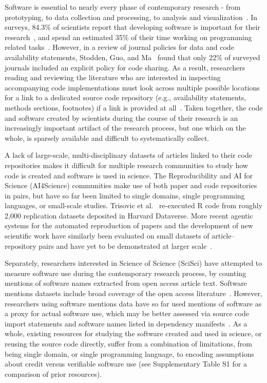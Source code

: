 \documentclass[pdflatex,sn-nature]{sn-jnl}%
\begin{document}
Software is essential to nearly every phase of contemporary research - from prototyping, to data collection and processing, to analysis and visualization~\cite{hocquet2024software}. In surveys, 84.3\% of scientists report that developing software is important for their research~\cite{hannay2009scientists}, and spend an estimated 35\% of their time working on programming related tasks~\cite{prabhu2011survey}. However, in a review of journal policies for data and code availability statements, Stodden, Guo, and Ma~\cite{stodden2013toward} found that only 22\% of surveyed journals included an explicit policy for code sharing. As a result, researchers reading and reviewing the literature who are interested in inspecting accompanying code implementations must look across multiple possible locations for a link to a dedicated source code repository (e.g., availability statements, methods sections, footnotes) if a link is provided at all~\cite{meyer2026papers,wattanakriengkrai2022github,lin2022automatic}. Taken together, the code and software created by scientists during the course of their research is an increasingly important artifact of the research process, but one which on the whole, is sparsely available and difficult to systematically collect.

A lack of large-scale, multi-disciplinary datasets of articles linked to their code repositories makes it difficult for multiple research communities to study how code is created and software is used in science. The Reproducibility and AI for Science (AI4Science) communities make use of both paper and code repositories in pairs, but have so far been limited to single domains, single programming languages, or small-scale studies. Trisovic et al.~\cite{trisovic2022large} re-executed R code from roughly 2,000 replication datasets deposited in Harvard Dataverse. More recent agentic systems for the automated reproduction of papers and the development of new scientific work have similarly been evaluated on small datasets of article--repository pairs and have yet to be demonstrated at larger scale~\cite{zhao2026autoreproduce,zhang2026paperrepro,shao2026sciscigpt}.

Separately, researchers interested in Science of Science (SciSci) have attempted to measure software use during the contemporary research process, by counting mentions of software names extracted from open access article text. Software mentions datasets include broad coverage of the open access literature~\cite{du2021softcite,schindler2021somesci,howison_2025_15149379}. However, researchers using software mentions data have so far used mentions of software as a proxy for actual software use, which may be better assessed via source code import statements and software names listed in dependency manifests~\cite{druskat2024dontmention,wu2026softwarespace,brown2026biomedical}. As a whole, existing resources for studying the software created and used in science, or reusing the source code directly, suffer from a combination of limitations, from being single domain, or single programming language, to encoding assumptions about credit versus verifiable software use (see Supplementary Table S1 for a comparison of prior resources).
\end{document}
